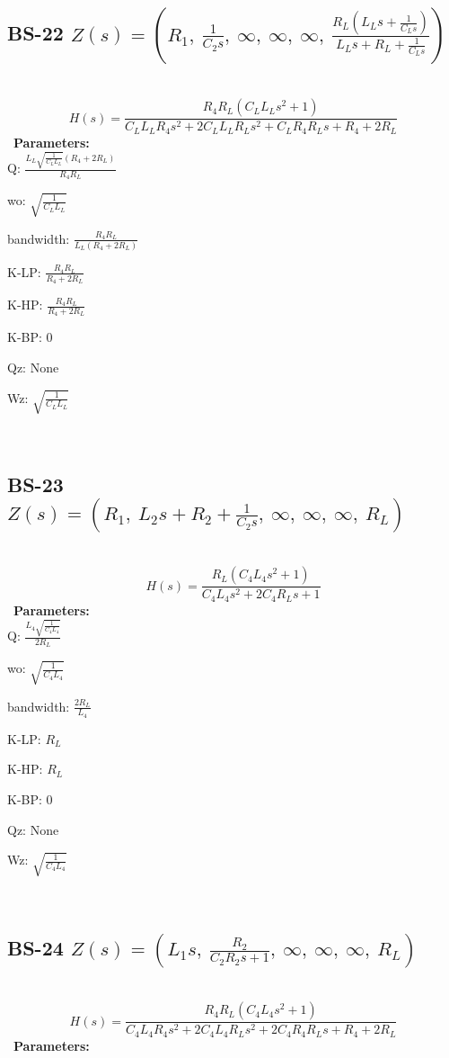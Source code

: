 \documentclass{article}
\begin{document}
\subsection{BS-22 $Z(s) = \left( R_{1}, \  \frac{1}{C_{2} s}, \  \infty, \  \infty, \  \infty, \  \frac{R_{L} \left(L_{L} s + \frac{1}{C_{L} s}\right)}{L_{L} s + R_{L} + \frac{1}{C_{L} s}}\right)$ } \ 
\textbf{\[H(s) = \frac{R_{4} R_{L} \left(C_{L} L_{L} s^{2} + 1\right)}{C_{L} L_{L} R_{4} s^{2} + 2 C_{L} L_{L} R_{L} s^{2} + C_{L} R_{4} R_{L} s + R_{4} + 2 R_{L}}\] } \ 
\textbf{Parameters:}\\ 

Q: $\frac{L_{L} \sqrt{\frac{1}{C_{L} L_{L}}} \left(R_{4} + 2 R_{L}\right)}{R_{4} R_{L}}$\ 

wo: $\sqrt{\frac{1}{C_{L} L_{L}}}$\ 

bandwidth: $\frac{R_{4} R_{L}}{L_{L} \left(R_{4} + 2 R_{L}\right)}$\ 

K-LP: $\frac{R_{4} R_{L}}{R_{4} + 2 R_{L}}$\ 

K-HP: $\frac{R_{4} R_{L}}{R_{4} + 2 R_{L}}$\ 

K-BP: $0$\ 

Qz: $\text{None}$\ 

Wz: $\sqrt{\frac{1}{C_{L} L_{L}}}$\ 

\ 

\subsection{BS-23 $Z(s) = \left( R_{1}, \  L_{2} s + R_{2} + \frac{1}{C_{2} s}, \  \infty, \  \infty, \  \infty, \  R_{L}\right)$ } \ 
\textbf{\[H(s) = \frac{R_{L} \left(C_{4} L_{4} s^{2} + 1\right)}{C_{4} L_{4} s^{2} + 2 C_{4} R_{L} s + 1}\] } \ 
\textbf{Parameters:}\\ 

Q: $\frac{L_{4} \sqrt{\frac{1}{C_{4} L_{4}}}}{2 R_{L}}$\ 

wo: $\sqrt{\frac{1}{C_{4} L_{4}}}$\ 

bandwidth: $\frac{2 R_{L}}{L_{4}}$\ 

K-LP: $R_{L}$\ 

K-HP: $R_{L}$\ 

K-BP: $0$\ 

Qz: $\text{None}$\ 

Wz: $\sqrt{\frac{1}{C_{4} L_{4}}}$\ 

\ 

\subsection{BS-24 $Z(s) = \left( L_{1} s, \  \frac{R_{2}}{C_{2} R_{2} s + 1}, \  \infty, \  \infty, \  \infty, \  R_{L}\right)$ } \ 
\textbf{\[H(s) = \frac{R_{4} R_{L} \left(C_{4} L_{4} s^{2} + 1\right)}{C_{4} L_{4} R_{4} s^{2} + 2 C_{4} L_{4} R_{L} s^{2} + 2 C_{4} R_{4} R_{L} s + R_{4} + 2 R_{L}}\] } \ 
\textbf{Parameters:}\\ 
\end{document}
